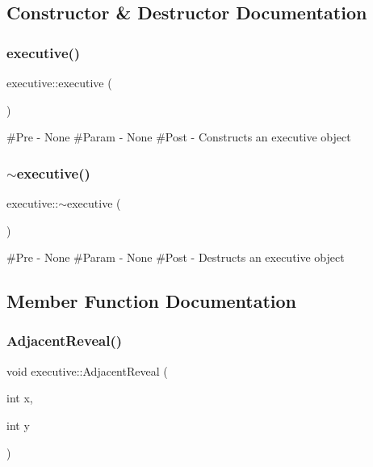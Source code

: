 \subsection{Constructor \& Destructor Documentation}
\mbox{\label{classexecutive_af89b69f24d47db479a8fc99c1905ddda}} 
\subsubsection{\texorpdfstring{executive()}{executive()}}
{\footnotesize\ttfamily executive\+::executive (\begin{DoxyParamCaption}{ }\end{DoxyParamCaption})}

\#\+Pre -\/ None \#\+Param -\/ None \#\+Post -\/ Constructs an executive object \mbox{\label{classexecutive_a0d6dc7441c758d7c1fa3a375720e6952}} 
\subsubsection{\texorpdfstring{$\sim$executive()}{~executive()}}
{\footnotesize\ttfamily executive\+::$\sim$executive (\begin{DoxyParamCaption}{ }\end{DoxyParamCaption})}

\#\+Pre -\/ None \#\+Param -\/ None \#\+Post -\/ Destructs an executive object 

\subsection{Member Function Documentation}
\mbox{\label{classexecutive_af6ca8c7e37912f612009a96a90113204}} 
\subsubsection{\texorpdfstring{AdjacentReveal()}{AdjacentReveal()}}
{\footnotesize\ttfamily void executive\+::\+Adjacent\+Reveal (\begin{DoxyParamCaption}\item[{int}]{x,  }\item[{int}]{y }\end{DoxyParamCaption})}

